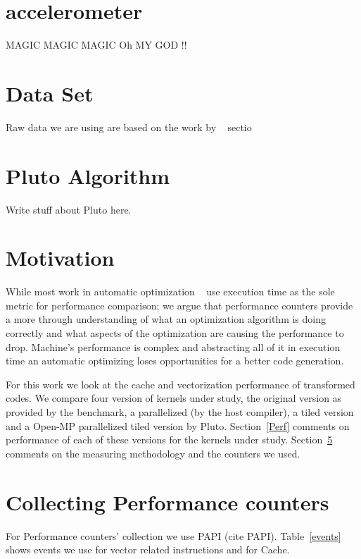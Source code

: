 \documentclass{article}
\begin{document}
\section{accelerometer}
\label{accelerometer} 
MAGIC MAGIC MAGIC Oh MY GOD !!

\section{Data Set}
\label{DataSet}

Raw data we are using are based on the work by ~\cite{ugulino2012wearable} sectio 

\section{Pluto Algorithm}
\label{Pluto}
Write stuff about Pluto here.

\section{Motivation}

While most work in automatic optimization ~\cite{bondhugula2008practical} use execution time as the sole metric for performance
comparison; we argue that performance counters provide a more through understanding of what an optimization algorithm is doing correctly 
and what aspects of the optimization are causing the performance to drop. Machine's performance is complex and abstracting all of it in  
execution time an automatic optimizing loses opportunities for a better code generation.

For this work we look at the cache and vectorization performance of transformed codes. We compare four version of kernels under study, 
the original version as provided by the benchmark, a parallelized (by the host compiler), a tiled version and a Open-MP parallelized tiled 
version by Pluto. Section~\ref{Perf} comments on performance of each of these versions for the kernels under study. Section~\ref{PAPI}
comments on the measuring methodology and the counters we used.

\section{Collecting Performance counters}
\label{PAPI}
For Performance counters' collection we use PAPI (cite PAPI). Table~\ref{events} shows events we use for vector related instructions and 
for Cache.
\end{document}
